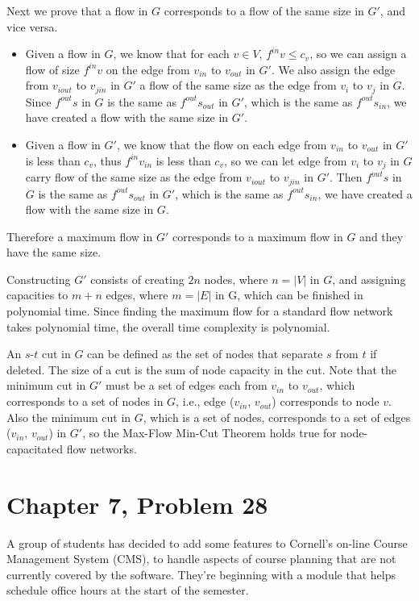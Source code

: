 \documentclass[12pt,letterpaper]{article}
\begin{document}
Next we prove that a flow in $G$ corresponds to a flow of the same size in $G'$, and vice versa.
\begin{itemize}
\item Given a flow in $G$, we know that for each $v\in V$, $f^{in}v\le c_v$, so we can assign a flow of size $f^{in}v$ on the edge from $v_{in}$ to $v_{out}$ in $G'$. We also assign the edge from $v_{iout}$ to $v_{jin}$ in $G'$ a flow of the same size as the edge from $v_i$ to $v_j$ in $G$. Since $f^{out}s$ in $G$ is the same as $f^{out}s_{out}$ in $G'$, which is the same as $f^{out}s_{in}$, we have created a flow with the same size in $G'$.
\item Given a flow in $G'$, we know that the flow on each edge from $v_{in}$ to $v_{out}$ in $G'$ is less than $c_v$, thus $f^{in}v_{in}$ is less than $c_v$, so we can let edge from $v_i$ to $v_j$ in $G$ carry flow of the same size as the edge from $v_{iout}$ to $v_{jin}$ in $G'$. Then $f^{out}s$ in $G$ is the same as $f^{out}s_{out}$ in $G'$, which is the same as $f^{out}s_{in}$, we have created a flow with the same size in $G$.
\end{itemize}
Therefore a maximum flow in $G'$ corresponds to a maximum flow in $G$ and they have the same size.

Constructing $G'$ consists of creating $2n$ nodes, where $n = |V|$ in $G$, and assigning capacities to $m+n$ edges, where $m = |E|$ in G, which can be finished in polynomial time. Since finding the maximum flow for a standard flow network takes polynomial time, the overall time complexity is polynomial.

An $s$-$t$ cut in $G$ can be defined as the set of nodes that separate $s$ from $t$ if deleted. The size of a cut is the sum of node capacity in the cut. Note that the minimum cut in $G'$ must be a set of edges each from $v_{in}$ to $v_{out}$, which corresponds to a set of nodes in $G$, i.e., edge ($v_{in}$, $v_{out}$) corresponds to node $v$. Also the minimum cut in $G$, which is a set of nodes, corresponds to a set of edges ($v_{in}$, $v_{out}$) in $G'$, so the Max-Flow Min-Cut Theorem holds true for node-capacitated flow networks.

\section*{Chapter 7, Problem 28}
A group of students has decided to add some features to Cornell's on-line
Course Management System (CMS), to handle aspects of course planning
that are not currently covered by the software. They're beginning with a
module that helps schedule office hours at the start of the semester.
\end{document}

